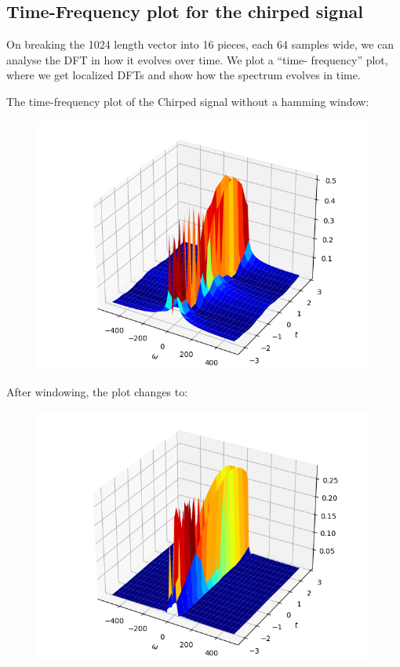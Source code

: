 \documentclass[11pt, a4paper]{article}
\begin{document}
\newpage
\subsection*{Time-Frequency plot for the chirped signal}
On breaking the 1024 length vector into 16 pieces, each 64 samples wide, we can analyse the DFT in how it evolves over time. We plot a “time- frequency” plot, where we get localized DFTs and show how the spectrum evolves in time.

The time-frequency plot of the Chirped signal without a hamming window:
\begin{figure}[!tbh]
\centering
\includegraphics[scale=0.63]{assgn10_plot14.png} 
\label{fig14}
\end{figure}

After windowing, the plot changes to:
\begin{figure}[!tbh]
\centering
\includegraphics[scale=0.63]{assgn10_plot15.png} 
\label{fig15}
\end{figure}
\end{document}

